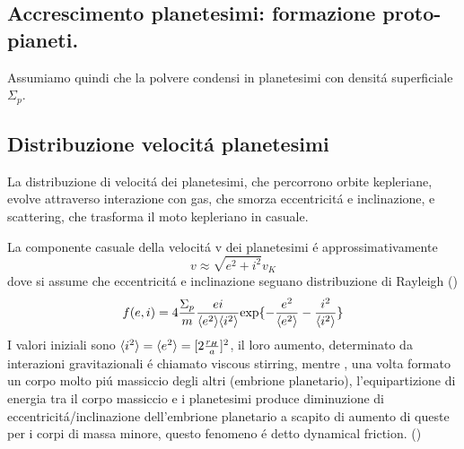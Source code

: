 \begin{reworking}
	\section{Accrescimento planetesimi: formazione proto-pianeti.}
	
	Assumiamo quindi che la polvere condensi in planetesimi con densit\'a superficiale $\Sigma_p$.
	\subsection{Distribuzione velocit\'a planetesimi}
	La distribuzione di velocit\'a dei planetesimi, che percorrono orbite kepleriane, evolve attraverso interazione con gas, che smorza eccentricit\'a e inclinazione, e scattering, che trasforma il moto kepleriano in casuale.
	
	
	La componente casuale della velocit\'a v dei planetesimi \'e approssimativamente
	\begin{equation}
	v\approx\sqrt{e^2+i^2}v_K
	\end{equation}
	dove si assume che eccentricit\'a e inclinazione seguano distribuzione di Rayleigh (\cite{ida1992n})
	\begin{equation}
	f(e,i)=4\frac{\Sigma_p}{m}\frac{ei}{\langle e^2 \rangle\langle i^2 \rangle}\text{exp}\{-\frac{e^2}{\langle e^2 \rangle}-\frac{i^2}{\langle i^2 \rangle}\}
	\end{equation}
	I valori iniziali sono $\langle i^2 \rangle=\langle e^2 \rangle=[2\frac{r_H}{a}]^2$, il loro aumento, determinato da interazioni gravitazionali \'e chiamato viscous stirring, mentre , una volta formato un corpo molto pi\'u massiccio degli altri (embrione planetario), l'equipartizione di energia tra il corpo massiccio e i planetesimi produce diminuzione di eccentricit\'a/inclinazione dell'embrione planetario a scapito di aumento di queste per i corpi di massa minore, questo fenomeno \'e detto dynamical friction. (\cite{kokubo2012dynamics})
	

\end{reworking}
